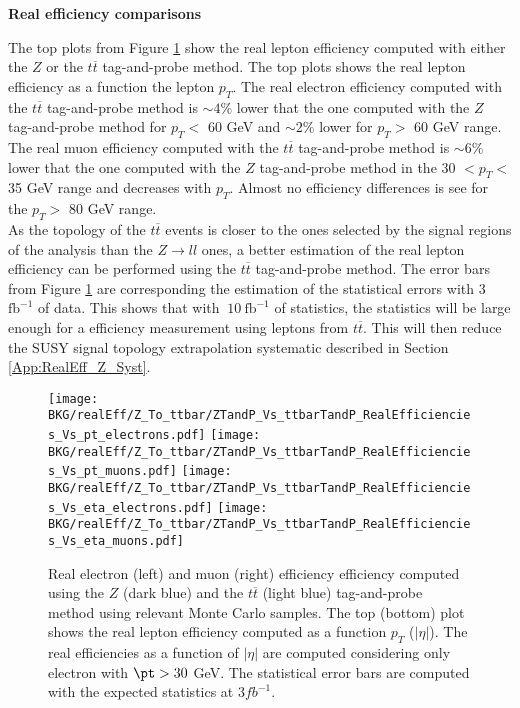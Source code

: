 	\par{\bf Real efficiency comparisons\\}	
	
	The top plots from Figure \ref{fig:Z_Vs_ttbar_RealEff} show the real lepton efficiency computed with either the $Z$ or the $t\overline{t}$ tag-and-probe method. The top plots shows the real lepton efficiency as a function the lepton $p_T$. The real electron efficiency computed with the $t\overline{t}$ tag-and-probe method is $\sim 4\%$ lower that the one computed with the $Z$ tag-and-probe method for $p_T <$ 60 GeV and $\sim 2\%$ lower for $p_T >$ 60 GeV range. The real muon efficiency computed with the $t\overline{t}$ tag-and-probe method is $\sim6\%$ lower that the one computed with the $Z$ tag-and-probe method in the 30 $< p_T <$ 35 GeV range and decreases with $p_T$. Almost no efficiency differences is see for the $p_T >$ 80 GeV range.\\ 
	As the topology of the $t\overline{t}$ events is closer to the ones selected by the signal regions of the analysis than the $Z\rightarrow ll$ ones, a better estimation of the real lepton efficiency can be performed using the $t\overline{t}$ tag-and-probe method. The error bars from Figure \ref{fig:Z_Vs_ttbar_RealEff} are corresponding the estimation of the statistical errors with 3 $\mathrm{fb}^{-1}$ of data. This shows that with $~10~\mathrm{fb}^{-1}$ of statistics, the statistics will be large enough for a efficiency measurement using leptons from $t\overline{t}$. This will then reduce the SUSY signal topology extrapolation systematic described in Section \ref{App:RealEff_Z_Syst}.
	
	
	\begin{figure}[!htb]
	  \begin{center} 
	   \texttt{[image: BKG/realEff/Z\_To\_ttbar/ZTandP\_Vs\_ttbarTandP\_RealEfficiencies\_Vs\_pt\_electrons.pdf]} 
	   \texttt{[image: BKG/realEff/Z\_To\_ttbar/ZTandP\_Vs\_ttbarTandP\_RealEfficiencies\_Vs\_pt\_muons.pdf]}
	   \texttt{[image: BKG/realEff/Z\_To\_ttbar/ZTandP\_Vs\_ttbarTandP\_RealEfficiencies\_Vs\_eta\_electrons.pdf]} 
	   \texttt{[image: BKG/realEff/Z\_To\_ttbar/ZTandP\_Vs\_ttbarTandP\_RealEfficiencies\_Vs\_eta\_muons.pdf]}
	   \caption{\label{fig:Z_Vs_ttbar_RealEff} Real electron (left) and muon (right) efficiency efficiency computed using the $Z$ (dark blue) and the $t\overline{t}$ (light blue) tag-and-probe method using relevant Monte Carlo samples. The top (bottom) plot shows the real lepton efficiency computed as a function $p_T$ ($|\eta|$). The real efficiencies as a function of $|\eta|$ are computed considering only electron with $\pt > 30$ GeV. The statistical error bars are computed with the expected statistics at $3 fb^{-1}$. }
	  \end{center}
	\end{figure}	
